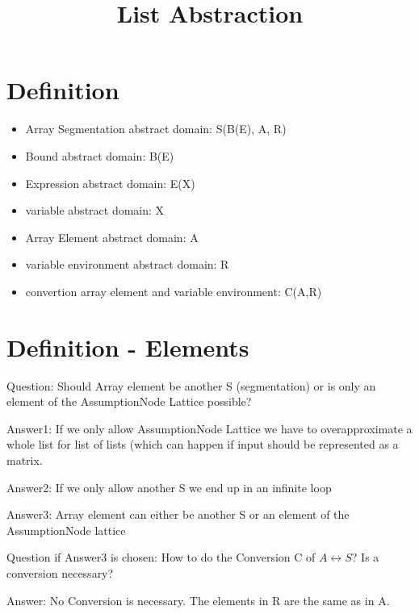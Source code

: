 \documentclass[11pt]{article}
\begin{document}
\title{List Abstraction}

\maketitle


\section{Definition}

\begin{itemize}
\item Array Segmentation abstract domain: S(B(E), A, R)
\item Bound abstract domain: B(E)
\item Expression abstract domain: E(X)
\item variable abstract domain: X
\item Array Element abstract domain: A
\item variable environment abstract domain: R
\item convertion array element and variable environment: C(A,R)
\end{itemize}

\section{Definition - Elements}

Question: Should Array element be another S (segmentation) or is only an element of the AssumptionNode Lattice possible?

Answer1: If we only allow AssumptionNode Lattice we have to overapproximate a whole list for list of lists (which can happen if input should be represented as a matrix.

Answer2: If we only allow another S we end up in an infinite loop

Answer3: Array element can either be another S or an element of the AssumptionNode lattice

Question if Answer3 is chosen: How to do the Conversion C of $A \leftrightarrow S$? Is a conversion necessary?

Answer: No Conversion is necessary. The elements in R are the same as in A.
\end{document}
